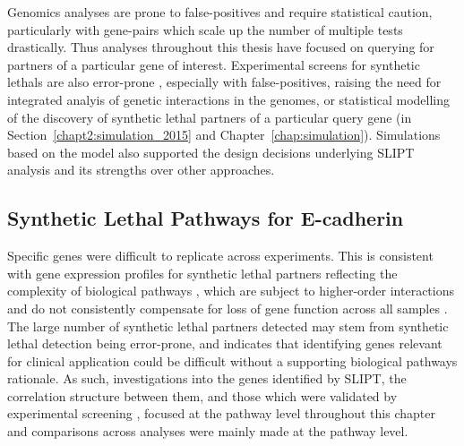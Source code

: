 Genomics analyses are prone to false-positives and require statistical caution, particularly with gene-pairs which scale up the number of multiple tests drastically. %
Thus analyses throughout this thesis have focused on querying for partners of a particular gene of interest. 
Experimental screens for \glspl{synthetic lethal} are also error-prone \citep{Lu2015, Fece2015, Lord2014}, especially with false-positives, raising the need for integrated analyis of genetic interactions in the \glspl{genome}, or statistical modelling of the discovery of \gls{synthetic lethal} partners of a particular query gene (in Section~\ref{chapt2:simulation_2015} and Chapter~\ref{chap:simulation}). Simulations based on the model also supported the design decisions underlying \gls{SLIPT} analysis and its strengths over other approaches.

\subsection{Synthetic Lethal Pathways for E-cadherin}

Specific genes were difficult to replicate across experiments. This is consistent with \gls{gene expression} profiles for \gls{synthetic lethal} partners reflecting the complexity of biological \glspl{pathway} , which are subject to higher-order interactions and do not consistently compensate for loss of gene function across all samples \citep{Jerby2014, Lu2015}. %
The large number of \gls{synthetic lethal} partners detected may stem from \gls{synthetic lethal} detection being error-prone, and indicates that identifying genes relevant for clinical application could be difficult without a supporting biological \glspl{pathway} rationale. As such, investigations into the genes identified by \gls{SLIPT}, the correlation structure between them, and those which were validated by experimental screening \citep{Telford2015}, focused at the \gls{pathway} level throughout this chapter and comparisons across analyses were mainly made at the \gls{pathway} level. %

